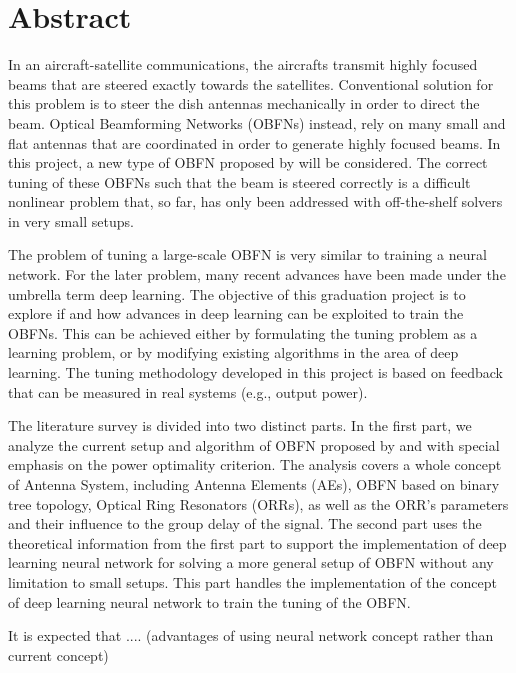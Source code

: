 %
\chapter*{Abstract}%

In an aircraft-satellite communications, the aircrafts transmit highly focused beams that are steered exactly towards the satellites. Conventional solution for this problem is to steer the dish antennas mechanically in order to direct the beam. Optical Beamforming Networks (OBFNs) instead, rely on many small and flat antennas that are coordinated in order to generate highly focused beams. In this project, a new type of OBFN proposed by \citet{Meijerink1} will be considered. The correct tuning of these OBFNs such that the beam is steered correctly is a difficult nonlinear problem that, so far, has only been addressed with off-the-shelf solvers in very small setups.

The problem of tuning a large-scale OBFN is very similar to training a neural network. For the later problem, many recent advances have been made under the umbrella term deep learning. The objective of this graduation project is to explore if and how advances in deep learning can be exploited to train the OBFNs. This can be achieved either by formulating the tuning problem as a learning problem, or by modifying existing algorithms in the area of deep learning. The tuning methodology developed in this project is based on feedback that can be measured in real systems (e.g., output power).

The literature survey is divided into two distinct parts. In the first part, we analyze the current setup and algorithm of OBFN proposed by \citet{Blokpoel} and \citet{Meijerink1} with special emphasis on the power optimality criterion. The analysis covers a whole concept of Antenna System, including Antenna Elements (AEs), OBFN based on binary tree topology, Optical Ring Resonators (ORRs), as well as the ORR's parameters and their influence to the group delay of the signal. The second part uses the theoretical information from the first part to support the implementation of deep learning neural network for solving a more general setup of OBFN without any limitation to small setups. This part handles the implementation of the concept of deep learning neural network to train the tuning of the OBFN.

It is expected that ....
(advantages of using neural network concept rather than current concept)

